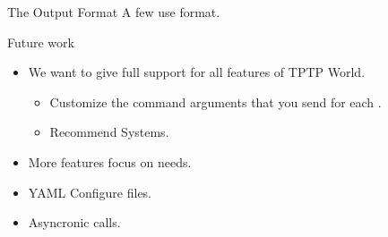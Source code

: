 \documentclass[newPxFont]{beamer}
\begin{document}
\begin{frame}{The Output Format}
A few \atps use  format.
\begin{table}
\label{table:1}
\centering
\caption{Some examples of outputs when an ATP finishes successfully}
\vspace*{1.5mm}
\end{table}
\end{frame}

\begin{frame}{Future work}
\begin{itemize}
\item We want to give full support for all features of TPTP World.
\begin{itemize}
  \item Customize the command arguments that you send for each \atps.
  \item Recommend Systems.
\end{itemize}
\item More features focus on \apia needs.
\item YAML Configure files.
\item Asyncronic calls.
\end{itemize}
\end{frame}



\end{document}
